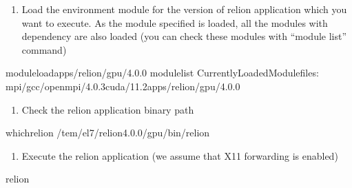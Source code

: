 \documentclass[a4paper,10pt,english]{sphinxmanual}
\begin{document}
\begin{enumerate}
%
\setcounter{enumi}{2}
\item {} 
\sphinxAtStartPar
Load the environment module for the version of relion application which you want to execute. As the module specified is loaded, all the modules with dependency are also loaded (you can check these modules with “module list” command)

\end{enumerate}

\begin{sphinxVerbatim}[commandchars=\\\{\}]
\PYGZdl{}\PYGZgt{}moduleloadapps/relion/gpu/4.0.0
\PYGZdl{}\PYGZgt{}modulelist
CurrentlyLoadedModulefiles:
mpi/gcc/openmpi/4.0.3cuda/11.2apps/relion/gpu/4.0.0
\end{sphinxVerbatim}
\begin{enumerate}
%
\setcounter{enumi}{3}
\item {} 
\sphinxAtStartPar
Check the relion application binary path

\end{enumerate}

\begin{sphinxVerbatim}[commandchars=\\\{\}]
\PYGZdl{}\PYGZgt{}whichrelion
/tem/el7/relion\PYGZhy{}4.0.0/gpu/bin/relion
\end{sphinxVerbatim}
\begin{enumerate}
%
\setcounter{enumi}{4}
\item {} 
\sphinxAtStartPar
Execute the relion application (we assume that X11 forwarding is enabled)

\end{enumerate}

\begin{sphinxVerbatim}[commandchars=\\\{\}]
\PYGZdl{}\PYGZgt{}relion
\end{sphinxVerbatim}

\end{document}
